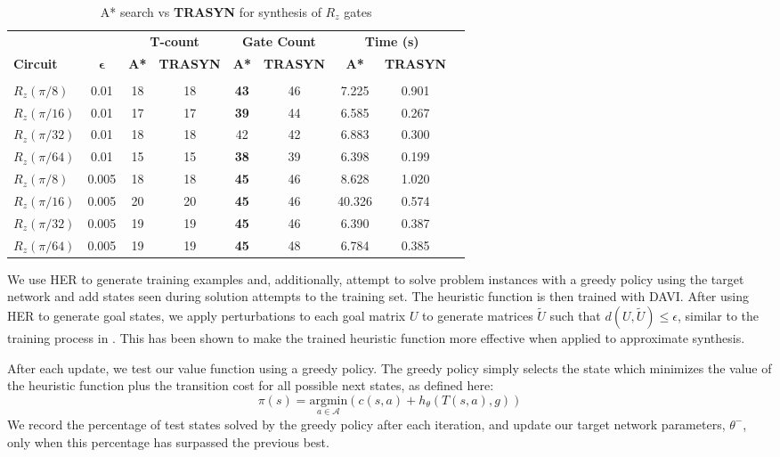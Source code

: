 \documentclass[letterpaper]{article} %
\begin{document}
\begin{table}[h!]
	\centering
	\begin{tabular}{lcccccccc}
		\hline\noalign{\vskip 3pt}
		& & \multicolumn{2}{c}{\textbf{T-count}} & \multicolumn{2}{c}{\textbf{Gate Count}} & \multicolumn{2}{c}{\textbf{Time (s)}} \\
		\cmidrule(lr){3-4} \cmidrule(lr){5-6} \cmidrule(lr){7-8}
		\textbf{Circuit} & $\boldsymbol{\epsilon}$ & \textbf{A*} & \textbf{TRASYN} & \textbf{A*} & \textbf{TRASYN} & \textbf{A*} & \textbf{TRASYN} \\
		\hline\\[-6pt]
		$R_z(\pi/8)$  & 0.01  & 18 & 18 & \textbf{43} & 46 & 7.225  & 0.901 \\[3pt]
		$R_z(\pi/16)$ & 0.01  & 17 & 17 & \textbf{39} & 44 & 6.585  & 0.267 \\[3pt]
		$R_z(\pi/32)$ & 0.01  & 18 & 18 & 42 & 42 & 6.883  & 0.300 \\[3pt]
		$R_z(\pi/64)$ & 0.01  & 15 & 15 & \textbf{38} & 39 & 6.398  & 0.199 \\[3pt]
		$R_z(\pi/8)$  & 0.005 & 18 & 18 & \textbf{45} & 46 & 8.628  & 1.020 \\[3pt]
		$R_z(\pi/16)$ & 0.005 & 20 & 20 & \textbf{45} & 46 & 40.326 & 0.574 \\[3pt]
		$R_z(\pi/32)$ & 0.005 & 19 & 19 & \textbf{45} & 46 & 6.390  & 0.387 \\[3pt]
		$R_z(\pi/64)$ & 0.005 & 19 & 19 & \textbf{45} & 48 & 6.784  & 0.385 \\[3pt]
		\hline
	\end{tabular}
	\caption{A* search vs \textbf{TRASYN} for synthesis of $R_z$ gates}
	\label{tab:one_qubit_benchmark}
\end{table}

We use HER to generate training examples and, additionally, attempt to solve problem instances with a greedy
policy using the target network and add states seen during solution attempts to the training set.
The heuristic function is then trained with DAVI.
After using HER to generate goal states,
we apply perturbations to each goal matrix $U$ to generate matrices $\tilde{U}$ such that $d(U,\tilde{U})\leq\epsilon$,
similar to the training process in \cite{weiden2025making}.
This has been shown to make the trained heuristic function more effective when applied to approximate synthesis.

After each update, we test our value function using a greedy policy. The greedy policy simply selects the state which minimizes the value of the heuristic function plus the transition cost for all possible next states, as defined here:
\begin{equation}
    \pi(s)=\underset{a\in \mathcal{A}}{\text{argmin}}(c(s,a)+h_{\theta}(T(s,a),g))
\end{equation}
We record the percentage of test states solved by the greedy policy after each iteration, and update our target network parameters, $\theta^-$, only when this percentage has surpassed the previous best.
\end{document}
